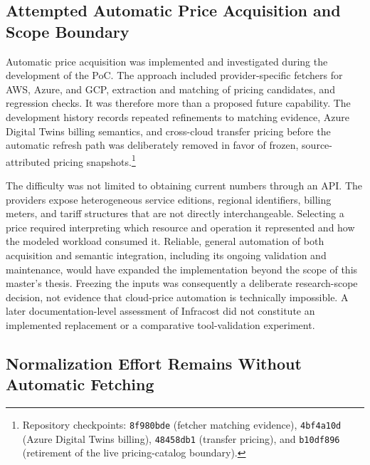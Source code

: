 \subsection{Attempted Automatic Price Acquisition and Scope Boundary}
\label{sec:pricing-acquisition-scope}

Automatic price acquisition was implemented and investigated during the
development of the PoC. The approach included provider-specific fetchers for
AWS, Azure, and GCP, extraction and matching of pricing candidates, and
regression checks. It was therefore more than a proposed future capability.
The development history records repeated refinements to matching evidence,
Azure Digital Twins billing semantics, and cross-cloud transfer pricing before
the automatic refresh path was deliberately removed in favor of frozen,
source-attributed pricing snapshots.\footnote{Repository checkpoints:
\texttt{8f980bde} (fetcher matching evidence), \texttt{4bf4a10d} (Azure Digital
Twins billing), \texttt{48458db1} (transfer pricing), and \texttt{b10df896}
(retirement of the live pricing-catalog boundary).}

The difficulty was not limited to obtaining current numbers through an API.
The providers expose heterogeneous service editions, regional identifiers,
billing meters, and tariff structures that are not directly interchangeable.
Selecting a price required interpreting which resource and operation it
represented and how the modeled workload consumed it. Reliable, general
automation of both acquisition and semantic integration, including its ongoing
validation and maintenance, would have expanded the implementation beyond the
scope of this master's thesis. Freezing the inputs was consequently a
deliberate research-scope decision, not evidence that cloud-price automation
is technically impossible. A later documentation-level assessment of
Infracost did not constitute an implemented replacement or a comparative
tool-validation experiment.


\subsection{Normalization Effort Remains Without Automatic Fetching}

